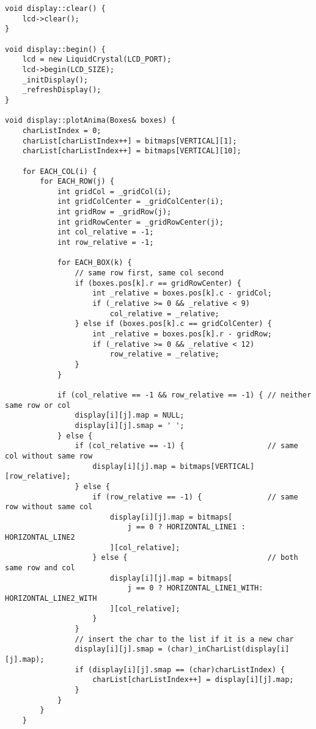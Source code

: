 \begin{verbatim}
void display::clear() {
    lcd->clear();
}

void display::begin() {
    lcd = new LiquidCrystal(LCD_PORT);
    lcd->begin(LCD_SIZE);
    _initDisplay();
    _refreshDisplay();
}

void display::plotAnima(Boxes& boxes) {
    charListIndex = 0;
    charList[charListIndex++] = bitmaps[VERTICAL][1];
    charList[charListIndex++] = bitmaps[VERTICAL][10];

    for EACH_COL(i) {
        for EACH_ROW(j) {
            int gridCol = _gridCol(i);
            int gridColCenter = _gridColCenter(i);
            int gridRow = _gridRow(j);
            int gridRowCenter = _gridRowCenter(j);
            int col_relative = -1;
            int row_relative = -1;

            for EACH_BOX(k) {
                // same row first, same col second
                if (boxes.pos[k].r == gridRowCenter) {
                    int _relative = boxes.pos[k].c - gridCol;
                    if (_relative >= 0 && _relative < 9)
                        col_relative = _relative;
                } else if (boxes.pos[k].c == gridColCenter) {
                    int _relative = boxes.pos[k].r - gridRow;
                    if (_relative >= 0 && _relative < 12)
                        row_relative = _relative;
                }
            }

            if (col_relative == -1 && row_relative == -1) { // neither same row or col
                display[i][j].map = NULL;
                display[i][j].smap = ' ';
            } else {
                if (col_relative == -1) {                   // same col without same row
                    display[i][j].map = bitmaps[VERTICAL][row_relative];
                } else {
                    if (row_relative == -1) {               // same row without same col
                        display[i][j].map = bitmaps[
                            j == 0 ? HORIZONTAL_LINE1 : HORIZONTAL_LINE2
                        ][col_relative];
                    } else {                                // both same row and col
                        display[i][j].map = bitmaps[
                            j == 0 ? HORIZONTAL_LINE1_WITH: HORIZONTAL_LINE2_WITH
                        ][col_relative];
                    }
                }
                // insert the char to the list if it is a new char
                display[i][j].smap = (char)_inCharList(display[i][j].map);
                if (display[i][j].smap == (char)charListIndex) {
                    charList[charListIndex++] = display[i][j].map;
                }
            }
        }
    }


\end{verbatim}
